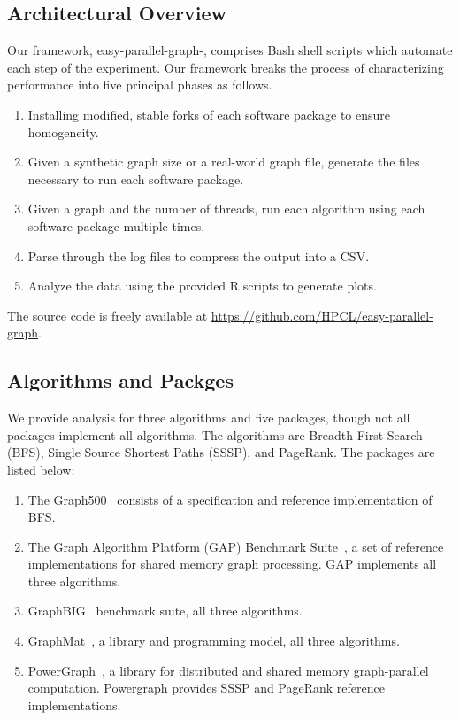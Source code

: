 \documentclass[conference]{IEEEtran}
\begin{document}
\subsection{Architectural Overview}
Our framework, easy-parallel-graph-\textasteriskcentered, comprises Bash shell scripts which automate each step of the experiment. Our framework breaks the process of characterizing performance into five principal phases as follows.
\begin{enumerate}
	\item Installing modified, stable forks of each software package to ensure homogeneity.
	\item Given a synthetic graph size or a real-world graph file, generate the files necessary to run each software package.
	\item Given a graph and the number of threads, run each algorithm using each software package multiple times.
	\item Parse through the log files to compress the output into a CSV.
	\item Analyze the data using the provided R scripts to generate plots.
\end{enumerate}
The source code is freely available at \url{https://github.com/HPCL/easy-parallel-graph}.


\subsection{Algorithms and Packges}
We provide analysis for three algorithms and five packages, though not all packages implement all algorithms. The algorithms are Breadth First Search (BFS), Single Source Shortest Paths (SSSP), and PageRank. The packages are listed below:

\begin{enumerate}
	\item The Graph500~\cite{Murphy:2010:Graph500} consists of a specification and reference implementation of BFS.
	\item The Graph Algorithm Platform (GAP) Benchmark Suite~\cite{Beamer:2015:GAPBench}, a set of reference implementations for shared memory graph processing. GAP implements all three algorithms.
	\item GraphBIG~\cite{Nai:2015:Graphbig} benchmark suite, all three algorithms.
	\item GraphMat~\cite{Sundaram:2015:GraphMat}, a library and programming model, all three algorithms.
	\item PowerGraph~\cite{Gonzalez:2012:Powergraph}, a library for distributed and shared memory graph-parallel computation. Powergraph provides SSSP and PageRank reference implementations.
\end{enumerate}
\end{document}
